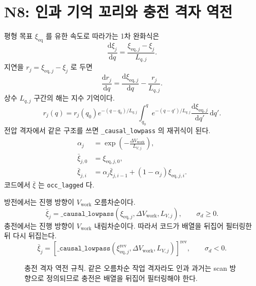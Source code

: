 \documentclass[11pt,a4paper]{article}
\newcommand{\dd}{\mathrm{d}}
\newcommand{\eq}{\mathrm{eq}}
\newcommand{\work}{\mathrm{work}}
\begin{document}
\section{N8: 인과 기억 꼬리와 충전 격자 역전}\label{sec:n8}
평형 목표 $\xi_{\eq}$ 를 유한 속도로 따라가는 1차 완화식은
\begin{equation}
\frac{\dd \xi_j}{\dd q}=\frac{\xi_{\eq,j}-\xi_j}{L_{q,j}}.
\label{eq:relaxqv7}
\end{equation}
지연을 $r_j=\xi_{\eq,j}-\xi_j$ 로 두면
\begin{equation}
\frac{\dd r_j}{\dd q}=\frac{\dd \xi_{\eq,j}}{\dd q}-\frac{r_j}{L_{q,j}}.
\label{eq:rv7}
\end{equation}
상수 $L_{q,j}$ 구간의 해는 지수 기억이다.
\begin{equation}
r_j(q)=r_j(q_0)e^{-(q-q_0)/L_{q,j}}
\int_{q_0}^{q}e^{-(q-q')/L_{q,j}}
\frac{\dd\xi_{\eq,j}}{\dd q'}\,\dd q'.
\label{eq:memoryv7}
\end{equation}
전압 격자에서 같은 구조를 쓰면 \texttt{\_causal\_lowpass} 의 재귀식이 된다.
\begin{align}
\alpha_j&=\exp\!\left(-\frac{\Delta V_{\work}}{L_{V,j}}\right),\label{eq:alpha}\\
\bar\xi_{j,0}&=\xi_{\eq,j,0},\label{eq:initlag}\\
\bar\xi_{j,i}&=\alpha_j\bar\xi_{j,i-1}+(1-\alpha_j)\xi_{\eq,j,i}.
\label{eq:lowpass}
\end{align}
코드에서 $\bar\xi$ 는 \texttt{occ\_lagged} 다.

방전에서는 진행 방향이 $V_{\work}$ 오름차순이다.
\begin{equation}
\bar\xi_j=\texttt{\_causal\_lowpass}(\xi_{\eq,j},\Delta V_{\work},L_{V,j}),\qquad \sigma_d\ge0.
\label{eq:dislowpass}
\end{equation}
충전에서는 진행 방향이 $V_{\work}$ 내림차순이다. 따라서 코드가 배열을 뒤집어 필터링한 뒤 다시 뒤집는다.
\begin{equation}
\bar\xi_j=
\left[\texttt{\_causal\_lowpass}(\xi_{\eq,j}^{\mathrm{rev}},\Delta V_{\work},L_{V,j})\right]^{\mathrm{rev}},
\qquad \sigma_d<0.
\label{eq:chglowpass}
\end{equation}

\begin{figure}[t]
\centering
{}
\caption{충전 격자 역전 규칙. 같은 오름차순 작업 격자라도 인과 과거는 scan 방향으로 정의되므로 충전은 배열을 뒤집어 필터링해야 한다.}
\label{fig:tailreverse}
\end{figure}
\end{document}
